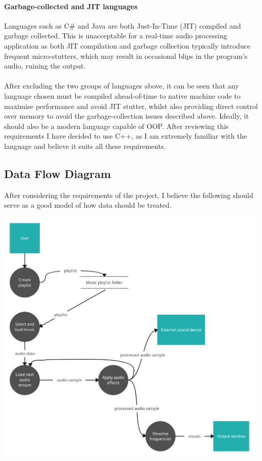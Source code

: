 \documentclass{article}
\begin{document}
	\paragraph{Garbage-collected and JIT languages}
	Languages such as C\# and Java are both Just-In-Time  (JIT) compiled and garbage collected.  This is unacceptable for a real-time audio processing application as both JIT compilation and garbage collection typically introduce frequent micro-stutters, which may result in occasional blips in the program's audio, ruining the output.
	
	\paragraph{}
	After excluding the two groups of languages above, it can be seen that any language chosen must be compiled ahead-of-time to native machine code to maximise performance and avoid JIT stutter, whilst also providing direct control over memory to avoid the garbage-collection issues described above. Ideally, it should also be a modern language capable of OOP. After reviewing this requirements I have decided to use C++, as I am extremely familiar with the language and believe it suits all these requirements.

	\subsection{Data Flow Diagram}
	After considering the requirements of the project, I believe the following should serve as a good model of how data should be treated.
	
	\includegraphics[width=13cm]{DFD}
\end{document}
